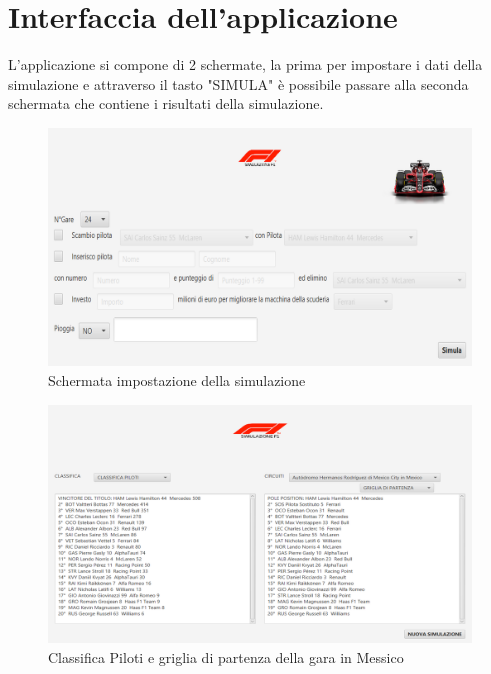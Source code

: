 \chapter{Interfaccia dell'applicazione}
\label{sec:Interfaccia dell'applicazione}
L'applicazione si compone di 2 schermate, la prima per impostare i dati della simulazione e attraverso il tasto "SIMULA" è possibile passare alla seconda schermata che contiene i risultati della simulazione.

\begin{figure}[h]
\centering
\includegraphics[width=1\linewidth]{images/Schermata impostazione simulazione senza dati.png}
\caption{Schermata impostazione della simulazione}
\label{fig:Schermata impostazione della simulazione}
\end{figure}

\begin{figure}[h]
\centering
\includegraphics[width=1\linewidth]{images/Risultati piloti.png}
\caption{Classifica Piloti e griglia di partenza della gara in Messico}
\label{fig:Classifica Piloti e griglia di partenza di una gara}
\end{figure}

